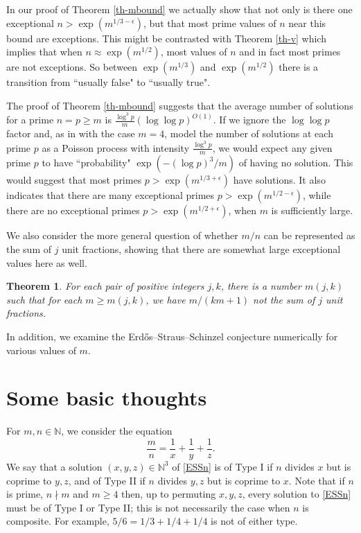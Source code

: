 \documentclass[12pt]{amsart}
\newtheorem{theorem}{Theorem}[section]
\theoremstyle{definition}
\theoremstyle{remark}
\numberwithin{equation}{section}
\begin{document}
In our proof of Theorem \ref{th-mbound} we actually show that not only is there one
exceptional $n> \exp(m^{1/3-\epsilon})$, but that most prime values of $n$ near this
bound are exceptions.  This might be contrasted with Theorem \ref{th-v} which implies
that when $n\approx\exp(m^{1/2})$, most values of $n$ and in fact most primes
are not exceptions.  So between $\exp(m^{1/3})$ and $\exp(m^{1/2})$ there is
a transition from ``usually false" to ``usually true".  

The proof of Theorem \ref{th-mbound} suggests that the average number of solutions
for a prime $n=p \ge m$ is $\frac{\log^3 p}{m} (\log\log p)^{O(1)}$. 
If we ignore the $\log\log p $ factor and, as in \cite[Remark 1.1]{ET} with the case $m=4$, 
model the number of solutions at each prime $p$ as a Poisson process with intensity 
$\frac{\log^3 p}{m}$, we would expect any given prime $p$ to have ``probability"
$\exp(-(\log p)^3/m)$ of having no solution. 
This would suggest that most primes $p>\exp(m^{1/3+\epsilon})$ have solutions.
It also indicates that there are many exceptional primes 
$p>\exp(m^{1/2-\epsilon}) $, 
while there are no exceptional primes $p>\exp(m^{1/2+\epsilon})$, when $m$ is sufficiently large.

 
 We also consider the more general question of whether $m/n$ can be represented
 as the sum of $j$ unit fractions, showing that there are somewhat large
 exceptional values here as well.
 \begin{theorem}
 \label{th-mjbound}
 For each pair of positive integers $j,k$,  there is a number $m(j,k)$ such that for
 each $m\ge m(j,k)$, we have $m/(km+1)$ not the sum of $j$ unit fractions.
 \end{theorem}
 
 In addition, we examine the Erd\H os--Straus--Schinzel conjecture numerically for
 various values of $m$.  
  
 \section{Some basic thoughts}
 For $m,n\in \mathbb{N}$, we consider the equation 
\begin{equation}
\label{ESSn}
\frac m n=\frac1x+\frac1y+\frac1z.
\end{equation}
We say that a solution $(x,y,z) \in \mathbb{N}^3$ of \eqref{ESSn} is of Type I if $n$ divides $x$ but is coprime to $y,z$, and 
of Type II if $n$ divides $y,z$ but is coprime to $x$.  
Note that if $n$ is prime, $n \nmid m$ and $m\ge 4$ then,
up to permuting $x,y,z$, every
solution to \eqref{ESSn} must be of Type I or Type II; this is not necessarily the case when
$n$ is composite.  For example, $5/6=1/3+1/4+1/4$ is not of either type.
\end{document}

